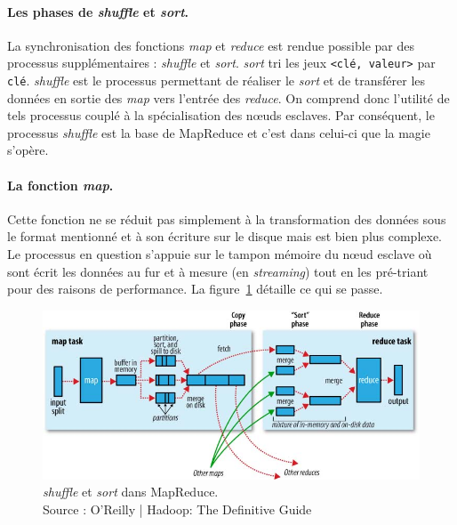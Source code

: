 \paragraph{Les phases de \emph{shuffle} et \emph{sort}.} La synchronisation des fonctions \emph{map} et \emph{reduce} est rendue possible par des processus supplémentaires : \emph{shuffle} et \emph{sort}. \emph{sort} tri les jeux \texttt{<clé, valeur>} par \texttt{clé}. \emph{shuffle} est le processus permettant de réaliser le \emph{sort} et de transférer les données en sortie des \emph{map} vers l'entrée des \emph{reduce}. On comprend donc l'utilité de tels processus couplé à la spécialisation des n\oe{}uds esclaves. Par conséquent, le processus \emph{shuffle} est la base de MapReduce et c'est dans celui-ci que la magie s'opère.

\paragraph{La fonction \emph{map}.} Cette fonction ne se réduit pas simplement à la transformation des données sous le format mentionné et à son écriture sur le disque mais est bien plus complexe. Le processus en question s'appuie sur le tampon mémoire du n\oe{}ud esclave où sont écrit les données au fur et à mesure (en \emph{streaming}) tout en les pré-triant pour des raisons de performance. La figure~\ref{fig:shuffle-sort-mapred} détaille ce qui se passe.

\begin{figure}[h!]
  \centering
  \includegraphics[scale=0.6]{images/shuffle_sort_mapred.png}
  \caption{\emph{shuffle} et \emph{sort} dans MapReduce. \\Source : O'Reilly | Hadoop: The Definitive Guide}
  \label{fig:shuffle-sort-mapred}
\end{figure}

